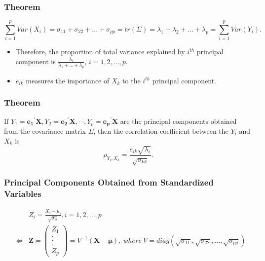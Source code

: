 \documentclass[10pt]{beamer} %
\begin{document}
\begin{frame}
   \frametitle{Theorem }
   \begin{equation*}
      \sum_{i=1}^p Var(X_i) = \sigma_{11}+\sigma_{22}+...+\sigma_{pp}=tr(\Sigma)
      = \lambda_1+\lambda_2+...+\lambda_p=\sum_{i=1}^p Var(Y_i).
   \end{equation*}
   \vspace{0.5cm}
   \begin{itemize}
      \item Therefore, the proportion of total variance explained by $i^{th}$
         principal component is $\frac{\lambda_i}{\lambda_1+...+\lambda_p}$,
         $i=1,2,...,p$.
         \vspace{0.5cm}
      \item $e_{ik}$ measures the importance of $X_k$ to the $i^{th}$ principal
         component.
   \end{itemize}
\end{frame}

\begin{frame}
   \frametitle{Theorem }
   If $Y_1=\boldsymbol{e_1}^{'}\boldsymbol{X},
   Y_2=\boldsymbol{e_2}^{'}\boldsymbol{X}, \cdots,
   Y_p=\boldsymbol{e_p}^{'}\boldsymbol{X}$ are the principal components
   obtained from the covariance matrix $\Sigma$, then the correlation
   coefficient between the $Y_i$ and $X_k$ is 
   \begin{equation*}
      \rho_{Y_i,X_k} = \frac{e_{ik}\sqrt{\lambda_i}}{\sqrt{\sigma_{kk}}}.
   \end{equation*}
\end{frame}

\begin{frame}
   \frametitle{Principal Components Obtained from Standardized Variables}
   \begin{eqnarray}
      &&	Z_i = \frac{X_i-\mu_i}{\sqrt{\sigma_{ii}}}, i=1,2,...,p \nonumber \\
      &\Leftrightarrow& \boldsymbol{Z} = \begin{pmatrix}
         Z_1\\ . \\ . \\ . \\
         Z_p 
      \end{pmatrix} = V^{-1}(\boldsymbol{X}-\boldsymbol{\mu}),\ where\
      V=diag(\sqrt{\sigma_{11}},\sqrt{\sigma_{22}},...,\sqrt{\sigma_{pp}})
      \nonumber
   \end{eqnarray}
\end{frame}
\end{document}

